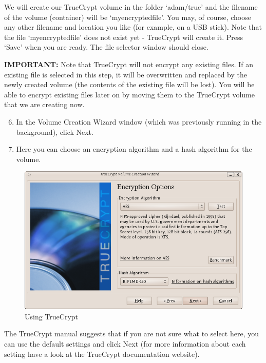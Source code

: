 We will create our TrueCrypt volume in the folder `adam/true' and the
filename of the volume (container) will be `myencryptedfile'. You may,
of course, choose any other filename and location you like (for example,
on a USB stick). Note that the file `myencryptedfile' does not exist yet
- TrueCrypt will create it. Press `Save' when you are ready. The file
selector window should close.

\textbf{IMPORTANT:} Note that TrueCrypt will not encrypt any existing
files. If an existing file is selected in this step, it will be
overwritten and replaced by the newly created volume (the contents of
the existing file will be lost). You will be able to encrypt existing
files later on by moving them to the TrueCrypt volume that we are
creating now.

\begin{enumerate}[1.]
\setcounter{enumi}{5}
\item
  In the Volume Creation Wizard window (which was previously running in
  the background), click Next.
\item
  Here you can choose an encryption algorithm and a hash algorithm for
  the volume.
\end{enumerate}
\begin{figure}[htbp]
\centering
\includegraphics{using_tc_006.png}
\caption{Using TrueCrypt}
\end{figure}

The TrueCrypt manual suggests that if you are not sure what to select
here, you can use the default settings and click Next (for more
information about each setting have a look at the TrueCrypt
documentation website).

